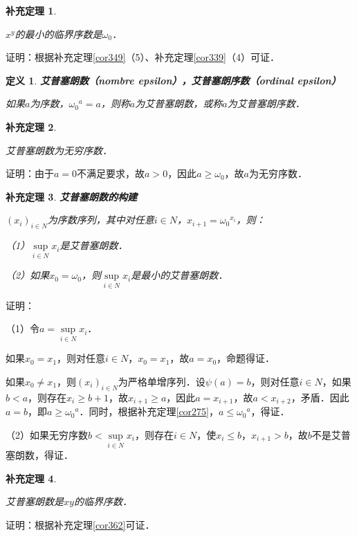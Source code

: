 \documentclass[12pt, a4paper, oneside]{book}
\newtheorem{cor}{补充定理}
\newtheorem{de}{定义}
\begin{document}
			\begin{cor}\label{cor365}
				\hfill\par
				$x^y$的最小的临界序数是$\omega_0$．
			\end{cor}
			证明：根据补充定理\ref{cor349}（5）、补充定理\ref{cor339}（4）可证．
			
			\begin{de}
				\textbf{艾普塞朗数（nombre epsilon），艾普塞朗序数（ordinal epsilon）}
				\par
				如果$a$为序数，${\omega_0}^a=a$，则称$a$为艾普塞朗数，或称$a$为艾普塞朗序数．
			\end{de}
			
			\begin{cor}\label{cor366}
				\hfill\par
				艾普塞朗数为无穷序数．
			\end{cor}
			证明：由于$a=0$不满足要求，故$a>0$，因此$a\geq \omega_0$，故$a$为无穷序数．
			
			\begin{cor}\label{cor367}
				\textbf{艾普塞朗数的构建}
				\par
				$(x_i)_{i\in N}$为序数序列，其中对任意$i\in N$，$x_{i+1}={\omega_0}^{x_i}$，则：
				\par
				 （1）$\mathop{sup}\limits_{i\in N}x_i$是艾普塞朗数．
				 \par
				 （2）如果$x_0=\omega_0$，则$\mathop{sup}\limits_{i\in N}x_i$是最小的艾普塞朗数．
			\end{cor}
			证明：
			\par
			（1）令$a=\mathop{sup}\limits_{i\in N}x_i$．
			\par
			如果$x_0=x_1$，则对任意$i\in N$，$x_0=x_1$，故$a=x_0$，命题得证．
			\par
			如果$x_0\neq x_1$，则$(x_i)_{i\in N}$为严格单增序列．设$\psi(a)=b$，则对任意$i\in N$，如果$b<a$，则存在$x_i\geq b+1$，故$x_{i+1}\geq a$，因此$a=x_{i+1}$，故$a<x_{i+2}$，矛盾．因此$a=b$，即$a\geq {\omega_0}^a$．同时，根据补充定理\ref{cor275}，$a\leq {\omega_0}^a$，得证．
			\par
			（2）如果无穷序数$b<\mathop{sup}\limits_{i\in N}x_i$，则存在$i\in N$，使$x_i\leq b$，$x_{i+1}>b$，故$b$不是艾普塞朗数，得证．
			
			\begin{cor}\label{cor368}
				\hfill\par
				艾普塞朗数是$xy$的临界序数．
			\end{cor}
			证明：根据补充定理\ref{cor362}可证．
			
\end{document}
